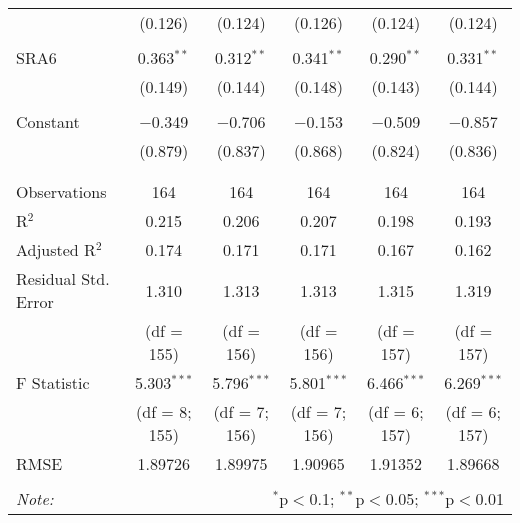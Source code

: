 \begin{table}[!htbp]
\begin{adjustbox}{width=\textwidth}
\begin{tabular}{@{\extracolsep{5pt}}lccccc}
  & (0.126) & (0.124) & (0.126) & (0.124) & (0.124) \\ 
  & & & & & \\ 
 SRA6 & 0.363$^{**}$ & 0.312$^{**}$ & 0.341$^{**}$ & 0.290$^{**}$ & 0.331$^{**}$ \\ 
  & (0.149) & (0.144) & (0.148) & (0.143) & (0.144) \\ 
  & & & & & \\ 
 Constant & $-$0.349 & $-$0.706 & $-$0.153 & $-$0.509 & $-$0.857 \\ 
  & (0.879) & (0.837) & (0.868) & (0.824) & (0.836) \\ 
  & & & & & \\ 
\hline \\[-1.8ex] 
Observations & 164 & 164 & 164 & 164 & 164 \\ 
R$^{2}$ & 0.215 & 0.206 & 0.207 & 0.198 & 0.193 \\ 
Adjusted R$^{2}$ & 0.174 & 0.171 & 0.171 & 0.167 & 0.162 \\ 
Residual Std. Error & 1.310 & 1.313  & 1.313 & 1.315 & 1.319\\ 
& (df = 155) & (df = 156) & (df = 156) & (df = 157) & (df = 157) \\
F Statistic & 5.303$^{***}$  & 5.796$^{***}$  & 5.801$^{***}$  & 6.466$^{***}$ & 6.269$^{***}$ \\ 
& (df = 8; 155) & (df = 7; 156) & (df = 7; 156) & (df = 6; 157) & (df = 6; 157) \\
RMSE & 1.89726 & 1.89975 & 1.90965 & 1.91352 & 1.89668 \\
\hline 
\hline \\[-1.8ex] 
\textit{Note:}  & \multicolumn{5}{r}{$^{*}$p$<$0.1; $^{**}$p$<$0.05; $^{***}$p$<$0.01} \\ 
\end{tabular} 
\end{adjustbox}
\end{table} 

